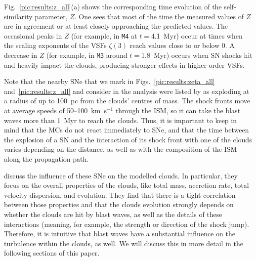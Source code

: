 Fig.~\ref{pic:results:z_all}(a) shows the corresponding time evolution of the self-similarity parameter, $Z$. 
One sees that most of the time the measured values of $Z$ are in agreement or at least closely approaching the predicted values. 
The occasional peaks in $Z$ (for example, in \texttt{M4} at $t=$4.1~Myr) occur at times when the scaling exponents of the VSFs $\zeta(3)$ reach values close to or below 0.
A decrease in $Z$ (for example, in \texttt{M3} around $t=$1.8~Myr) occurs when SN shocks hit and heavily impact the clouds, producing stronger effects in higher order VSFs.

Note that the nearby SNe that we mark in Figs.~\ref{pic:results:zeta_all} and~\ref{pic:results:z_all} and consider in the analysis were listed by  as exploding at a radius of up to 100~pc from the clouds' centres of mass. The shock fronts move at average speeds of 50--100~km~s$^{-1}$ through the ISM, so it can take the blast waves more than 1~Myr to reach the clouds. Thus, it is important to keep in mind that the MCs do not react immediately to SNe, and that the time between the explosion of a SN and the interaction of its shock front with one of the clouds varies depending on the distance, as well as with the composition of the ISM along the propagation path.

 discuss the influence of these SNe on the modelled clouds.
In particular, they focus on the overall properties of the clouds, like total mass, accretion rate, total velocity dispersion, and evolution.
They find that there is a tight correlation between those properties and that the clouds evolution strongly depends on whether the clouds are hit by blast waves, as well as the details of these interactions (meaning, for example, the strength or direction of the shock jump).
Therefore, it is intuitive that blast waves have a substantial influence on the turbulence within the clouds, as well. 
We will discuss this in more detail in the following sections of this paper.

